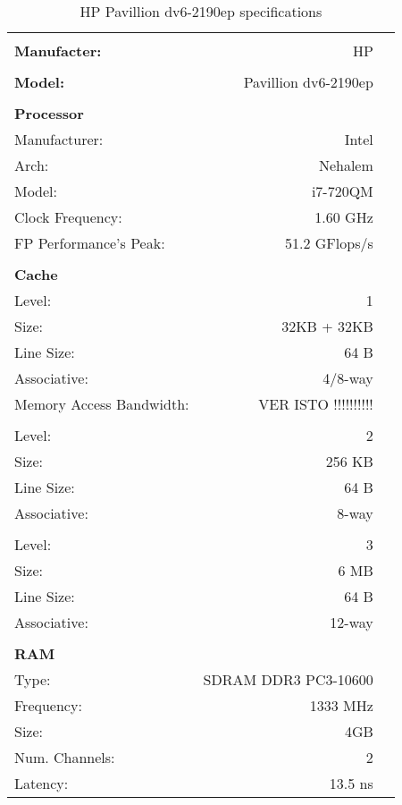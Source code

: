 \documentclass[a4paper,10pt,openright,openbib]{article}
\begin{document}
\begin{table}[!htp]
		\begin{tabular}{lrl}
			\hline \\
			\textbf{Manufacter:} & HP \\
			\hline \\
			\textbf{Model:} & Pavillion dv6-2190ep \\
			\hline \\
			\textbf{Processor} & & \\
			Manufacturer: & Intel & \\
			Arch: & Nehalem & \\
			Model: & i7-720QM & \\
			Clock Frequency: & 1.60 GHz & \\
			FP Performance's Peak: & 51.2 GFlops/s & \\
			\hline \\
			\textbf{Cache} & & \\
			Level: & 1 & \\
			Size: & 32KB + 32KB & \\
			Line Size: & 64 B & \\
			Associative: & 4/8-way & \\
			Memory Access Bandwidth: & VER ISTO !!!!!!!!!! & \\
			\\
			Level: & 2 & \\
			Size: & 256 KB & \\
			Line Size: & 64 B & \\
			Associative: & 8-way & \\
			\\
			Level: & 3 & \\
			Size: & 6 MB & \\
			Line Size: & 64 B & \\
			Associative: & 12-way & \\
			\hline \\
			\textbf{RAM} \\
			Type: & SDRAM DDR3 PC3-10600 & \\
			Frequency: & 1333 MHz & \\
			Size: & 4GB & \\
			Num. Channels: & 2 & \\
			Latency: & 13.5 ns & \\
		\end{tabular}
		\caption{HP Pavillion dv6-2190ep specifications}
		\label{tab:hp}
\end{table}
\end{document}
